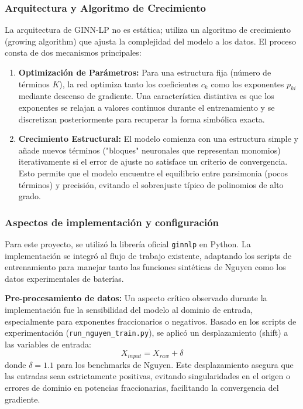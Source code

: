 \subsubsection{Arquitectura y Algoritmo de Crecimiento}

La arquitectura de GINN-LP no es estática; utiliza un algoritmo de crecimiento (growing algorithm) que ajusta la complejidad del modelo a los datos. El proceso consta de dos mecanismos principales:

\begin{enumerate}
    \item \textbf{Optimización de Parámetros:} Para una estructura fija (número de términos $K$), la red optimiza tanto los coeficientes $c_k$ como los exponentes $p_{ki}$ mediante descenso de gradiente. Una característica distintiva es que los exponentes se relajan a valores continuos durante el entrenamiento y se discretizan posteriormente para recuperar la forma simbólica exacta.
    
    \item \textbf{Crecimiento Estructural:} El modelo comienza con una estructura simple y añade nuevos términos ("bloques" neuronales que representan monomios) iterativamente si el error de ajuste no satisface un criterio de convergencia. Esto permite que el modelo encuentre el equilibrio entre parsimonia (pocos términos) y precisión, evitando el sobreajuste típico de polinomios de alto grado.
\end{enumerate}

\subsubsection{Aspectos de implementación y configuración}

Para este proyecto, se utilizó la librería oficial \texttt{ginnlp} en Python. La implementación se integró al flujo de trabajo existente, adaptando los scripts de entrenamiento para manejar tanto las funciones sintéticas de Nguyen como los datos experimentales de baterías.

\textbf{Pre-procesamiento de datos:}
Un aspecto crítico observado durante la implementación fue la sensibilidad del modelo al dominio de entrada, especialmente para exponentes fraccionarios o negativos. Basado en los scripts de experimentación (\texttt{run\_nguyen\_train.py}), se aplicó un desplazamiento (shift) a las variables de entrada:
\begin{equation}
    X_{input} = X_{raw} + \delta
\end{equation}
donde $\delta = 1.1$ para los benchmarks de Nguyen. Este desplazamiento asegura que las entradas sean estrictamente positivas, evitando singularidades en el origen o errores de dominio en potencias fraccionarias, facilitando la convergencia del gradiente.

